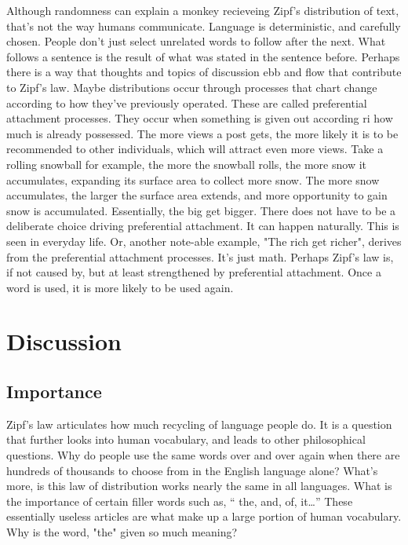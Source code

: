 \documentclass[a4paper,10pt]{article}
\begin{document}
Although randomness can explain a monkey recieveing Zipf's distribution of text, that's not the way humans communicate. Language is deterministic, and carefully chosen. People don't just select unrelated words to follow after the next. What follows a sentence is the result of what was stated in the sentence before. Perhaps there is a way that thoughts and topics of discussion ebb and flow that contribute to Zipf's law. Maybe distributions occur through processes that chart change according to how they've previously operated. These are called preferential attachment processes. They occur when something is given out according ri how much is already possessed. The more views a post gets, the more likely it is to be recommended to other individuals, which will attract even more views. Take a rolling snowball for example, the more the snowball rolls, the more snow it accumulates, expanding its surface area to collect more snow. The more snow accumulates, the larger the surface area extends, and more opportunity to gain snow is accumulated. Essentially, the big get bigger. There does not have to be a deliberate choice driving preferential attachment. It can happen naturally. This is seen in everyday life. Or, another note-able example, "The rich get richer", derives from the preferential attachment processes. It's just math. Perhaps Zipf's law is, if not caused by, but at least strengthened by preferential attachment. Once a word is used, it is more likely to be used again.

	

\section{Discussion}

\subsection{Importance}

Zipf’s law articulates how much recycling of language people do. It is a question that further looks into human vocabulary, and leads to other philosophical questions. Why do people use the same words over and over again when there are hundreds of thousands to choose from in the English language alone? What’s more, is this law of distribution works nearly the same in all languages. What is the importance of certain filler words such as, “ the, and, of, it…” These essentially useless articles are what make up a large portion of human vocabulary. Why is the word, "the" given so much meaning?
\end{document}
